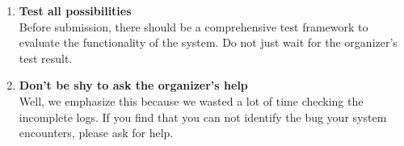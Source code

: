 \documentclass[11pt,oneside,onecolumn,letterpaper]{article}
\begin{document}
\begin{enumerate}
    \item \textbf{Test all possibilities}\\
    Before submission, there should be a comprehensive test framework to evaluate the functionality of the system. 
    Do not just wait for the organizer's test result.

    \item \textbf{Don't be shy to ask the organizer's help}\\
    Well, we emphasize this because we wasted a lot of time checking the incomplete logs.
    If you find that you can not identify the bug your system encounters, please ask for help.

\end{enumerate}


\end{document}
